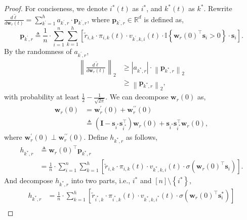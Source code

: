 \documentclass[10pt]{article}
\def\rvs{{\mathbf{s}}}
\def\rvw{{\mathbf{w}}}
\def\rvp{{\mathbf{p}}}
\def\rmI{{\mathbf{I}}}
\def\sR{{\mathbb{R}}}
\def\sI{{\mathbb{I}}}
\begin{document}
\begin{proof}
	 For conciseness, we denote $i^*(t)$ as $i^*$, and $k^*(t)$ as $k^*$. Rewrite $\frac{d\tilde{\ell}}{d \rvw_r(t)} = \sum\limits_{k^
	\prime=1}^{h}{ a_{k^\prime,r} \cdot \rvp_{k^\prime, r} }$, where $\rvp_{k^\prime, r} \in \sR^d$ is defined as, 
\begin{equation*}
	\rvp_{k^\prime, r} \triangleq \frac{1}{n} \cdot \sum\limits_{i=1}^{n}{ \sum\limits_{k=1}^{h}{ \left[ \tilde{r}_{i,k} \cdot \pi_{i,k}(t) \cdot v_{k^\prime,k,i}(t) \cdot \sI\left\{ \rvw_r(0)^\top \rvs_i > 0 \right\} \cdot \rvs_i \right] } }.
\end{equation*}
By the randomness of $a_{k^\prime,r}$,
\begin{equation}
\label{eq:gradient_p_lowerbound}
\begin{split}
	\left\| \frac{d\tilde{\ell}}{d \rvw_r(t)} \right\|_2 &\ge \left| a_{k^*,r} \right| \cdot \left\| \rvp_{k^*, r}\right\|_2 \\
	&\ge \left\| \rvp_{k^*, r}\right\|_2,
\end{split}
\end{equation}
with probability at least $\frac{1}{2} - \frac{1}{\sqrt{2\pi}}$. We can decompose $\rvw_r(0)$ as,
\begin{equation}
\label{eq:decompose_w}
\begin{split}
	\rvw_r(0) &= \rvw_r^\prime(0) + \rvw_r^{\prime\prime}(0) \\
	&\triangleq \left( \rmI - \rvs_{i^*}\rvs_{i^*}^\top \right) \rvw_r(0) +  \rvs_{i^*}\rvs_{i^*}^\top \rvw_r(0),
\end{split}
\end{equation}
where $\rvw_r^\prime(0) \perp \rvw_r^{\prime\prime}(0)$. Define $h_{k^*,r}$ as follows,
\begin{equation*}
\begin{split}
	h_{k^*,r} &\triangleq \rvw_r(0)^\top \rvp_{k^*, r} \\
	&= \frac{1}{n} \cdot \sum\limits_{i=1}^{n}{ \sum\limits_{k=1}^{h}{ \left[ \tilde{r}_{i,k} \cdot \pi_{i,k}(t) \cdot v_{k^*,k,i}(t) \cdot \sigma( \rvw_r(0)^\top \rvs_i ) \right] } }.
\end{split}
\end{equation*}
And decompose $h_{k^*,r}$ into two parts, i.e., $i^*$ and $[n] \setminus \left\{ i^* \right\}$,
\begin{equation}
\label{eq:decompose_h}
\begin{split}
	h_{k^*,r} &= \frac{1}{n} \cdot \sum\limits_{k=1}^{h}{ \left[ \tilde{r}_{i^*,k} \cdot \pi_{i^*,k}(t) \cdot v_{k^*,k,i^*}(t) \cdot \sigma( \rvw_r(0)^\top \rvs_i^* ) \right] } \\

\end{split}
\end{equation}
\end{proof}
\end{document}
